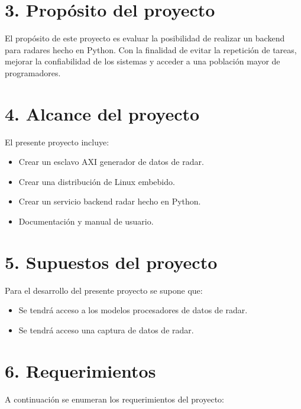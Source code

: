\documentclass[
11pt, %
]{charter}
\begin{document}
\section{3. Propósito del proyecto}
\label{sec:proposito}

El propósito de este proyecto es evaluar la posibilidad de realizar un backend
para radares hecho en Python. Con la finalidad de evitar la repetición de
tareas, mejorar la confiabilidad de los sistemas y acceder a una población mayor
de programadores.

\newpage

\section{4. Alcance del proyecto}
\label{sec:alcance}

El presente proyecto incluye:

\begin{itemize}
  \item Crear un esclavo AXI generador de datos de radar.
  \item Crear una distribución de Linux embebido.
  \item Crear un servicio backend radar hecho en Python.
  \item Documentación y manual de usuario.
\end{itemize}

\section{5. Supuestos del proyecto}
\label{sec:supuestos}

Para el desarrollo del presente proyecto se supone que:

\begin{itemize}
	\item Se tendrá acceso a los modelos procesadores de datos de radar.
	\item Se tendrá acceso una captura de datos de radar.
\end{itemize}

\section{6. Requerimientos}
\label{sec:requerimientos}

A continuación se enumeran los requerimientos del proyecto:
\end{document}
